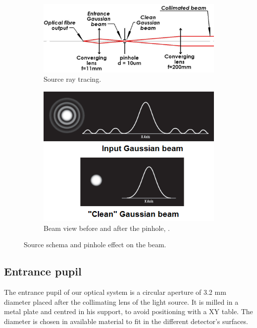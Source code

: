\begin{figure}
\centering
    \begin{subfigure}{0.5\textwidth}
        \includegraphics[width=\textwidth]{Figures/source.png}
        \caption{Source ray tracing.}
        \label{fig:sourceRayTracing}
    \end{subfigure}
    \quad
    \begin{subfigure}{0.3\textwidth}
        \includegraphics[width=\textwidth]{Figures/pinholeEffect.png}
        \caption{Beam view before and after the pinhole, \citep{SpatialFilters}.}
        \label{fig:pinholeEffect}
    \end{subfigure}
    \decoRule
    \caption{Source schema and pinhole effect on the beam.}
\end{figure}

\subsection{Entrance pupil}
\label{subsec:EntrancePupil}

The entrance pupil of our optical system is a circular aperture of 3.2 mm diameter placed after the collimating lens of the light source. It is milled in a metal plate and centred in his support, to avoid positioning with a XY table. The diameter is chosen in available material to fit in the different detector's surfaces.

